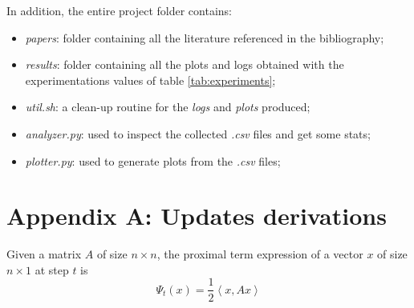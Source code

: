 \documentclass[notitlepage]{article}
\begin{document}
In addition, the entire project folder contains:
\begin{itemize}
  \item \textit{papers}: folder containing all the literature referenced in the bibliography;
  \item \textit{results}: folder containing all the plots and logs obtained with the experimentations values of table \ref{tab:experiments};
  \item \textit{util.sh}: a clean-up routine for the \textit{logs} and \textit{plots} produced;
  \item \textit{analyzer.py}: used to inspect the collected \textit{.csv} files and get some stats;
  \item \textit{plotter.py}: used to generate plots from the \textit{.csv} files;
\end{itemize}


\newpage




\newpage

\appendix

\section{Appendix A: Updates derivations}
\label{sec:appendix}
Given a matrix $A$ of size $n \times n$, the proximal term expression of a vector $x$ of size $n\times 1$ at step $t$ is
\[
  \Psi_t(x) = \frac{1}{2} \left\langle x, A x \right\rangle  
\]
\end{document}
